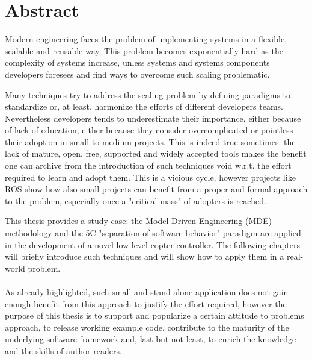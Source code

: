 


\begingroup
\let\clearpage\relax
\let\cleardoublepage\relax
\let\cleardoublepage\relax

\chapter*{Abstract}
Modern engineering faces the problem of implementing systems in a flexible, scalable and reusable way. This problem becomes exponentially hard as the complexity of systems increase, unless systems and systems components developers foresees and find ways to overcome such scaling problematic.

Many techniques try to address the scaling problem by defining paradigms to standardize or, at least, harmonize the efforts of different developers teams. Nevertheless developers tends to underestimate their importance, either because of lack of education, either because they consider overcomplicated or pointless their adoption in small to medium projects. This is indeed true sometimes: the lack of mature, open, free, supported and widely accepted tools makes the benefit one can archive from the introduction of such techniques void w.r.t. the effort required to learn and adopt them. This is a vicious cycle, however projects like ROS
show how also small projects can benefit from a proper and formal approach to the problem, especially once a "critical mass" of adopters is reached.

This thesis provides a study case: the Model Driven Engineering (MDE) methodology and the 5C "separation of software behavior" paradigm are applied in the development of a novel low-level copter controller. The following chapters will briefly introduce such techniques and will show how to apply them in a real-world problem.
\\
\\
As already highlighted, such small and stand-alone application does not gain enough benefit from this approach to justify the effort required, however the purpose of this thesis is to support and popularize a certain attitude to problems approach, to release working example code, contribute to the maturity of the underlying software framework and, last but not least, to enrich the knowledge and the skills of author readers.

\endgroup			

\vfill